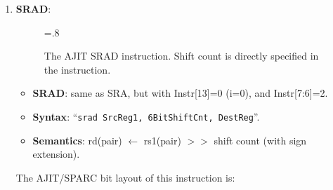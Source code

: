 \begin{enumerate}
\begin{enumerate}
  \item \textbf{SRAD}:\\
    \begin{center}
      \begin{figure}[h]
        \centering
        \epsfxsize=.8\linewidth
        \caption{The AJIT  SRAD instruction.  Shift count  is directly
          specified in the instruction.}
        \label{fig:ajit:srad:insn}
      \end{figure}
    \end{center}
    \begin{itemize}
    \item []\textbf{SRAD}: same as SRA, but with Instr[13]=0 (i=0),
      and Instr[7:6]=2.
    \item []\textbf{Syntax}: ``\texttt{srad SrcReg1, 6BitShiftCnt,
        DestReg}''. \\
    \item []\textbf{Semantics}: rd(pair) $\leftarrow$ rs1(pair) $>>$
      shift count (with sign extension).
    \end{itemize}

    The AJIT/SPARC bit layout of this instruction is:


\end{enumerate}
\end{enumerate}
